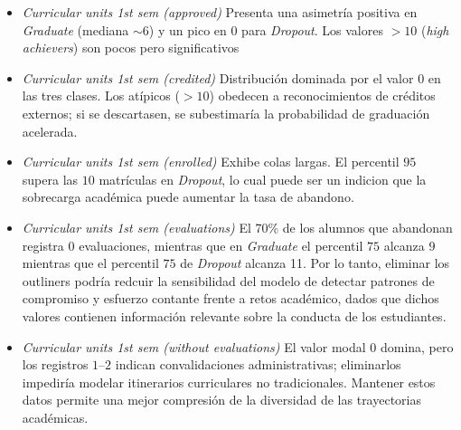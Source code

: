 \documentclass{report}[14pt]
\begin{document}
\begin{itemize}
\item \textit{Curricular units 1st sem (approved)}  Presenta una asimetría positiva en \textit{Graduate} (mediana $\sim6$) y un pico en $0$ para \textit{Dropout}.  Los valores $>10$ (\emph{high achievers}) son pocos pero significativos
\item \textit{Curricular units 1st sem (credited)}  Distribución dominada por el valor $0$ en las tres clases.  Los atípicos ($>10$) obedecen a reconocimientos de créditos externos; si se descartasen, se subestimaría la probabilidad de graduación acelerada.
\item \textit{Curricular units 1st sem (enrolled)}  Exhibe colas largas.  El percentil $95$ supera las $10$ matrículas en \textit{Dropout}, lo cual puede ser un indicion que la sobrecarga académica puede aumentar la tasa de abandono.
\item \textit{Curricular units 1st sem (evaluations)}  El 70\% de los alumnos que abandonan registra $0$ evaluaciones, mientras que en \textit{Graduate} el percentil $75$ alcanza $9$ mientras que el percentil $75$ de \textit{Dropout} alcanza 11. Por lo tanto, eliminar los outliners podría redcuir la sensibilidad del modelo de detectar patrones de compromiso y esfuerzo contante frente a retos académico, dados que dichos valores contienen información relevante sobre la conducta de los estudiantes.
\item \textit{Curricular units 1st sem (without evaluations)}  El valor modal $0$ domina, pero los registros $1$--$2$ indican convalidaciones administrativas; eliminarlos impediría modelar itinerarios curriculares no tradicionales. Mantener estos datos permite una mejor compresión de la diversidad de las trayectorias académicas.
\end{itemize}
\end{document}
